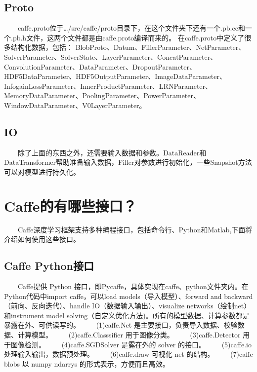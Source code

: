 \subsection{ Proto}\label{proto}

  caffe.proto位于\ldots{}/src/caffe/proto目录下，在这个文件夹下还有一个.pb.cc和一个.pb.h文件，这两个文件都是由caffe.proto编译而来的。
在caffe.proto中定义了很多结构化数据，包括：
BlobProto、Datum、FillerParameter、NetParameter、SolverParameter、SolverState、LayerParameter、ConcatParameter、ConvolutionParameter、DataParameter、DropoutParameter、HDF5DataParameter、HDF5OutputParameter、ImageDataParameter、InfogainLossParameter、InnerProductParameter、LRNParameter、MemoryDataParameter、PoolingParameter、PowerParameter、WindowDataParameter、V0LayerParameter。

\subsection{ IO}\label{io}

  除了上面的东西之外，还需要输入数据和参数。DataReader和DataTransformer帮助准备输入数据，Filler对参数进行初始化，一些Snapshot方法可以对模型进行持久化。

\section{Caffe的有哪些接口？}\label{caffeux7684ux6709ux54eaux4e9bux63a5ux53e3}

  Caffe深度学习框架支持多种编程接口，包括命令行、Python和Matlab,下面将介绍如何使用这些接口。

\subsection{ Caffe Python接口}\label{caffe-pythonux63a5ux53e3}

  Caffe提供 Python
接口，即Pycaffe，具体实现在caffe、python文件夹内。在Python代码中import
caffe，可以load models（导入模型）、forward and backward
（前向、反向迭代）、handle IO（数据输入输出）、visualize
networks（绘制net）和instrument model
solving（自定义优化方法)。所有的模型数据、计算参数都是暴露在外、可供读写的。
  (1)caffe.Net 是主要接口，负责导入数据、校验数据、计算模型。
  (2)caffe.Classsifier 用于图像分类。   (3)caffe.Detector 用于图像检测。
  (4)caffe.SGDSolver 是露在外的 solver 的接口。   (5)caffe.io
处理输入输出，数据预处理。   (6)caffe.draw 可视化 net 的结构。
  (7)caffe blobs 以 numpy ndarrys 的形式表示，方便而且高效。

